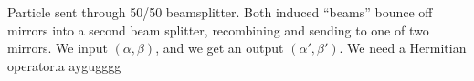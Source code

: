 
Particle sent through 50/50 beamsplitter. Both induced ``beams'' bounce off mirrors into a second beam splitter, recombining and sending to one of two mirrors. We input $(\alpha ,\beta )$, and we get an output $(\alpha ',\beta ')$. We need a Hermitian operator.a aygugggg
